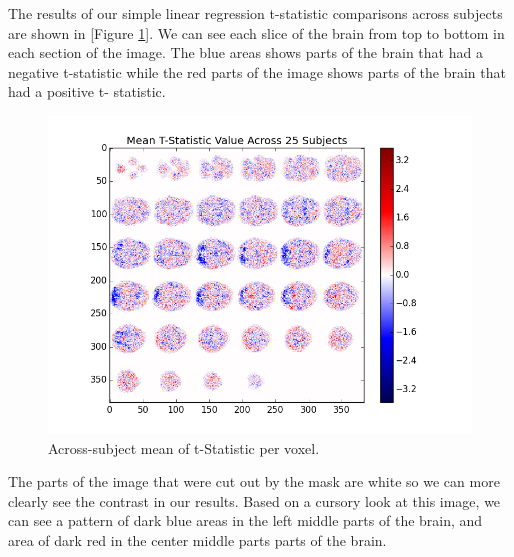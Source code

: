 
\par \indent The results of our simple linear regression t-statistic 
comparisons across subjects are shown in [Figure \ref{fig:mask}]. We can see 
each slice of the brain from top to bottom in each section of the image. The 
blue areas shows parts of the brain that had a negative t-statistic while the 
red parts of the image shows parts of the brain that had a positive t-
statistic.

\begin{figure}[ht]
\centering
\includegraphics[scale=0.5]{images/hypothesis_testing}  
\caption{Across-subject mean of t-Statistic per voxel.}
\label{fig:mask}
\end{figure}



\par The parts of the image that were cut out by the mask are white so we can 
more clearly see the contrast in our results. Based on a cursory look at this 
image, we can see a pattern of dark blue areas in the left middle parts of 
the brain, and area of dark red in the center middle parts parts of the 
brain. 
